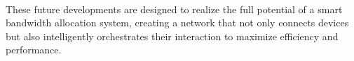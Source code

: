 \documentclass[10pt]{article}
\begin{document}
\paragraph{}
These future developments are designed to realize the full potential of a smart bandwidth allocation system, creating a network that not only connects devices but also intelligently orchestrates their interaction to maximize efficiency and performance.

\newpage


\end{document}
